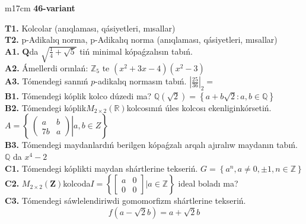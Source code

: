 \documentclass{article}
\begin{document}
\begin{tabular}{m{17cm}}
\textbf{46-variant}
\newline

\textbf{T1.} Kolcolar (anıqlaması, qásiyetleri, mısallar) \\
\textbf{T2.} p-Adikalıq norma, p-Adikalıq norma (anıqlaması, qásiyetleri, mısallar) \\
\textbf{A1.} \(\mathbf{Q}\)da \(\sqrt{\frac{1}{4} + \sqrt{5}}\) tiń minimal kópaǵzalısın tabıń. \\
\textbf{A2.} Ámellerdi orınlań: \(\mathbb{Z}_{5}\) te \(\left( x^{2} + 3x - 4 \right)\left( x^{2} - 3 \right)\) \\
\textbf{A3.} Tómendegi sannıń \(p\)-adikalıq normasın tabıń. \(|\frac{25}{36}|_{2} =\) \\
\textbf{B1.} Tómendegi kóplik kolco dúzedi ma? \(\mathbb{Q}\left( \sqrt{2} \right) = \left\{ a + b\sqrt{2}:a,b \in \mathbb{Q} \right\}\) \\
\textbf{B2.} Tómendegi kóplik\(M_{2 \times 2}\left( \mathbb{R} \right)\)kolcosınıń úles kolcosı ekenliginkórsetiń. \(A = \left\{ \left. \ \begin{pmatrix}
a & b \\
7b & a
\end{pmatrix} \right|a,b \in Z \right\}\) \\
\textbf{B3.} Tómendegi maydanlardıń berilgen kópaǵzalı arqalı ajıralıw maydanın tabıń. \(\mathbb{Q}\) da \(x^{4} - 2\) \\
\textbf{C1.} Tómendegi kóplikti maydan shártlerine tekseriń. \(G = \left\{ a^{n},a \neq 0, \pm 1,n \in \mathbb{Z} \right\}\) \\
\textbf{C2.} \(M_{2 \times 2}\left( \mathbf{Z} \right)\)kolcoda\(I = \left\{ \begin{bmatrix}
a & 0 \\
0 & 0
\end{bmatrix}|a\mathbb{\in Z} \right\}\) ideal boladı ma? \\
\textbf{C3.} Tómendegi sáwlelendiriwdi gomomorfizm shártlerine tekseriń.
\[f\left( a - \sqrt{2}b \right) = a + \sqrt{2}b\] \\

\end{tabular}
\vspace{1cm}
\end{document}
